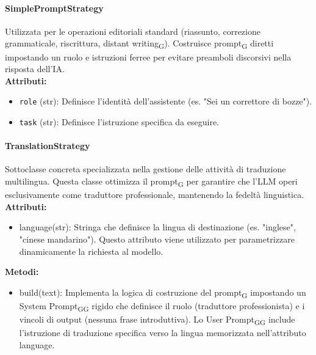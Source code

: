 \documentclass[11pt,a4paper]{article}
\newcommand{\gls}[1]{#1\textsubscript{G}}
\begin{document}
\paragraph{SimplePromptStrategy}
Utilizzata per le operazioni editoriali standard (riassunto, correzione grammaticale, riscrittura, \gls{distant writing}). Costruisce \gls{prompt} diretti impostando un ruolo e istruzioni ferree per evitare preamboli discorsivi nella risposta dell'IA.
\\ \textbf{Attributi:}
\begin{itemize}
    \item \texttt{role} (str): Definisce l'identità dell'assistente (es. "Sei un correttore di bozze").
    \item \texttt{task} (str): Definisce l'istruzione specifica da eseguire.
\end{itemize}

\paragraph{TranslationStrategy} 
Sottoclasse concreta specializzata nella gestione delle attività di traduzione multilingua. Questa classe ottimizza il \gls{prompt} per garantire che l'LLM operi esclusivamente come traduttore professionale, mantenendo la fedeltà linguistica.\\
\textbf{Attributi:}
\begin{itemize}
    \item language(str): Stringa che definisce la lingua di destinazione (es. "inglese", "cinese mandarino"). Questo attributo viene utilizzato per parametrizzare dinamicamente la richiesta al modello.
\end{itemize}
\textbf{Metodi:}
\begin{itemize}
    \item build(text): Implementa la logica di costruzione del \gls{prompt} impostando un \gls{System \gls{Prompt}} rigido che definisce il ruolo (traduttore professionista) e i vincoli di output (nessuna frase introduttiva). Lo \gls{User \gls{Prompt}} include l'istruzione di traduzione specifica verso la lingua memorizzata nell'attributo language.
\end{itemize}
\end{document}
